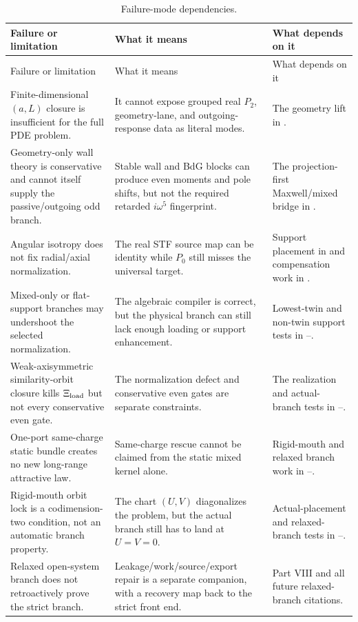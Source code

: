 \begin{longtable}{L{0.24\textwidth}L{0.35\textwidth}L{0.25\textwidth}}
\caption{Failure-mode dependencies.}\label{tab:failure-mode-dependencies}\\
\toprule
Failure or limitation & What it means & What depends on it \\
\midrule
\endfirsthead
\toprule
Failure or limitation & What it means & What depends on it \\
\midrule
\endhead
Finite-dimensional \((a,L)\) closure is insufficient for the full PDE problem. & It cannot expose grouped real \(P_2\), geometry-lane, and outgoing-response data as literal modes. & The geometry lift in . \\
\addlinespace
Geometry-only wall theory is conservative and cannot itself supply the passive/outgoing odd branch. & Stable wall and BdG blocks can produce even moments and pole shifts, but not the required retarded \(i\omega^5\) fingerprint. & The projection-first Maxwell/mixed bridge in . \\
\addlinespace
Angular isotropy does not fix radial/axial normalization. & The real STF source map can be identity while \(P_0\) still misses the universal target. & Support placement in  and compensation work in . \\
\addlinespace
Mixed-only or flat-support branches may undershoot the selected normalization. & The algebraic compiler is correct, but the physical branch can still lack enough loading or support enhancement. & Lowest-twin and non-twin support tests in --. \\
\addlinespace
Weak-axisymmetric similarity-orbit closure kills \(\Xi_{\rm load}\) but not every conservative even gate. & The normalization defect and conservative even gates are separate constraints. & The realization and actual-branch tests in --. \\
\addlinespace
One-port same-charge static bundle creates no new long-range attractive law. & Same-charge rescue cannot be claimed from the static mixed kernel alone. & Rigid-mouth and relaxed branch work in --. \\
\addlinespace
Rigid-mouth orbit lock is a codimension-two condition, not an automatic branch property. & The chart \((U,V)\) diagonalizes the problem, but the actual branch still has to land at \(U=V=0\). & Actual-placement and relaxed-branch tests in --. \\
\addlinespace
Relaxed open-system branch does not retroactively prove the strict branch. & Leakage/work/source/export repair is a separate companion, with a recovery map back to the strict front end. & Part VIII and all future relaxed-branch citations. \\
\bottomrule
\end{longtable}


